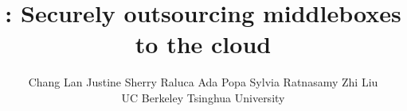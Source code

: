 \documentclass[letterpaper,twocolumn,10pt]{article}
\date{}
\title{
  \vspace{-0.6in}
  \sys: Securely outsourcing middleboxes to the cloud
}
\author{
  {\rm Chang Lan} \qquad 
  {\rm Justine Sherry} \qquad 
  {\rm Raluca Ada Popa} \qquad 
  {\rm Sylvia Ratnasamy} \qquad 
  {\rm Zhi Liu\affila} \\
  UC Berkeley \qquad \affila Tsinghua University
}
\begin{document}
\maketitle









%
%
%



%

{
  }

  
\end{document}
